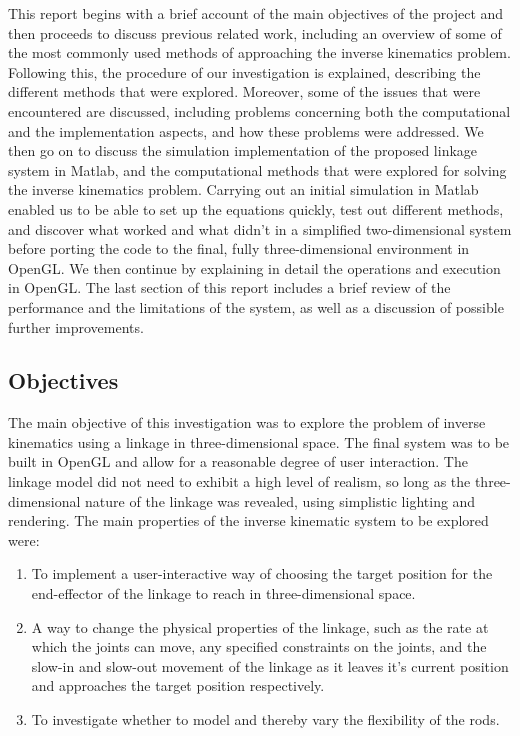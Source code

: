 \documentclass[paper=a4, fontsize=11pt]{scrartcl} %
\numberwithin{equation}{section} %
\numberwithin{figure}{section} %
\numberwithin{table}{section} %
\begin{document}
This report begins with a brief account of the main objectives of the project and then proceeds to discuss previous related work, including an overview of some of the most commonly used methods of approaching the inverse kinematics problem. Following this, the procedure of our investigation is explained, describing the different methods that were explored. Moreover, some of the issues that were encountered are discussed, including problems concerning both the computational and the implementation aspects, and how these problems were addressed. We then go on to discuss the simulation implementation of the proposed linkage system in Matlab, and the computational methods that were explored for solving the inverse kinematics problem. Carrying out an initial simulation in Matlab enabled us to be able to set up the equations quickly, test out different methods, and discover what worked and what didn't in a simplified two-dimensional system before porting the code to the final, fully three-dimensional environment in OpenGL. We then continue by explaining in detail the operations and execution in OpenGL. The last section of this report includes a brief review of the performance and the limitations of the system, as well as a discussion of possible further improvements.

\subsection{Objectives}

The main objective of this investigation was to explore the problem of inverse kinematics using a linkage in three-dimensional space. The final system was to be built in OpenGL and allow for a reasonable degree of user interaction. The linkage model did not need to exhibit a high level of realism, so long as the three-dimensional nature of the linkage was revealed, using simplistic lighting and rendering. The main properties of the inverse kinematic system to be explored were:

\begin{enumerate}
\item
To implement a user-interactive way of choosing the target position for the end-effector of the linkage to reach in three-dimensional space.

\item
A way to change the physical properties of the linkage, such as the rate at which the joints can move, any specified constraints on the joints, and the slow-in and slow-out movement of the linkage as it leaves it's current position and approaches the target position respectively.

\item
To investigate whether to model and thereby vary the flexibility of the rods.
\end{enumerate} 
\end{document}
